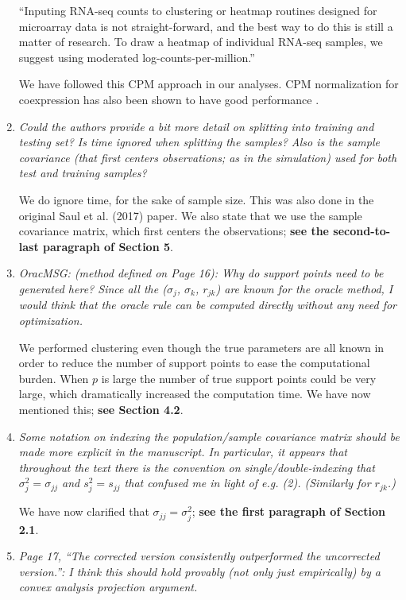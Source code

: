 \documentclass[12pt]{article}
\begin{document}
\begin{enumerate}
  ``Inputing RNA-seq counts to clustering or heatmap routines designed for microarray data is not straight-forward, and the best way to do this is still a matter of research. To draw a heatmap of individual RNA-seq samples, we suggest using moderated log-counts-per-million.''

  We have followed this CPM approach in our analyses. CPM normalization for coexpression has also been shown to have good performance \citep{johnson2022robust}.

\item \emph{Could the authors provide a bit more detail on splitting into training and testing set? Is time ignored when splitting the samples? Also is the sample covariance (that first centers observations; as in the simulation) used for both test and training samples?}

  We do ignore time, for the sake of sample size. This was also done in the original Saul et al. (2017) paper. We also state that we use the sample covariance matrix, which first centers the observations; \textbf{see the second-to-last paragraph of Section 5}.

\item \emph{OracMSG: (method defined on Page 16): Why do support points need to be generated here? Since all the ($\sigma_j$, $\sigma_k$, $r_{jk}$) are known for the oracle method, I would think that the oracle rule can be computed directly without any need for optimization.}

  We performed clustering even though the true parameters are all known in order to reduce the number of support points to ease the computational burden. When $p$ is large the number of true support points could be very large, which dramatically increased the computation time. We have now mentioned this; \textbf{see Section 4.2}.

\item \emph{Some notation on indexing the population/sample covariance matrix should be made more explicit in the manuscript. In particular, it appears that throughout the text there is the convention on single/double-indexing that $\sigma^2_j = \sigma_{jj}$ and $s^2_j = s_{jj}$ that confused me in light of e.g. (2). (Similarly for $r_{jk}$.)}

  We have now clarified that $\sigma_{jj} = \sigma_j^2$; \textbf{see the first paragraph of Section 2.1}.

\item \emph{Page 17, ``The corrected version consistently outperformed the uncorrected version.'': I think this should hold provably (not only just empirically) by a convex analysis projection argument.}


\end{enumerate}
\end{document}
